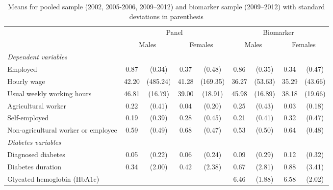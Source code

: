 \documentclass[12pt,english,british]{article}
\newcommand{\sym}[1]{\rlap{#1}}%
\begin{document}
\begin{table}[!ht]
\caption{\label{tab:Pooled-sample-characteristics}Means  for pooled sample (2002, 2005-2006, 2009--2012) and biomarker sample (2009--2012) with standard deviations in parenthesis}
\begin{center}

\begin{adjustbox}{max width=\textwidth}
{
\def\sym#1{\ifmmode^{#1}\else\(^{#1}\)\fi}
\begin{tabular}{l*{4}{cc}}
\toprule
                    &\multicolumn{4}{c}{Panel}                          &\multicolumn{4}{c}{Biomarker}                      \\\cmidrule(lr){2-5}\cmidrule(lr){6-9}
                    &\multicolumn{2}{c}{Males}&\multicolumn{2}{c}{Females}&\multicolumn{2}{c}{Males}&\multicolumn{2}{c}{Females}\\
\midrule
\hspace*{10mm}\emph{Dependent variables}&& \\
Employed            &        0.87&      (0.34)&        0.37&      (0.48)&        0.86&      (0.35)&        0.34&      (0.47)\\
Hourly wage             &       42.20&    (485.24)&       41.28&    (169.35)&       36.27&     (53.63)&       35.29&     (43.66)\\
Usual weekly working hours &       46.81&     (16.79)&       39.00&     (18.91)&       45.98&     (16.89)&       38.18&     (19.66)\\
Agricultural worker &        0.22&      (0.41)&        0.04&      (0.20)&        0.25&      (0.43)&        0.03&      (0.18)\\
Self-employed       &        0.19&      (0.39)&        0.28&      (0.45)&        0.21&      (0.41)&        0.32&      (0.47)\\
Non-agricultural worker or employee&        0.59&      (0.49)&        0.68&      (0.47)&        0.53&      (0.50)&        0.64&      (0.48)\\
\hspace*{10mm}\emph{Diabetes variables}&&&& \\
Diagnosed diabetes  &        0.05&      (0.22)&        0.06&      (0.24)&        0.09&      (0.29)&        0.12&      (0.32)\\
Diabetes duration   &        0.34&      (2.00)&        0.42&      (2.38)&        0.67&      (2.81)&        0.88&      (3.41)\\
Glycated hemoglobin (HbA1c)&            &            &            &            &        6.46&      (1.88)&        6.58&      (2.02)\\

\end{tabular}}
\end{adjustbox}
\end{center}
\end{table}
\end{document}
